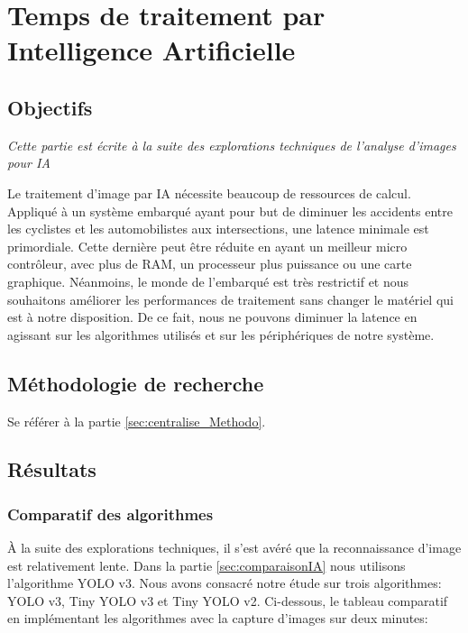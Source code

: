 \section{Temps de traitement par Intelligence Artificielle}
\label{sec:hwInference}

\subsection{Objectifs}
\label{sec:hwInference_Objectifs}

\textit{Cette partie est écrite à la suite des explorations techniques de l'analyse d'images pour \gls{IA}}

Le traitement d'image par \gls{IA} nécessite beaucoup de ressources de calcul. 
Appliqué à un système embarqué ayant pour but de diminuer les accidents entre les cyclistes et les automobilistes aux intersections, 
une latence minimale est primordiale.
Cette dernière peut être réduite en ayant un meilleur micro contrôleur, avec plus de RAM, un processeur plus puissance ou une carte graphique. 
Néanmoins, le monde de l'embarqué est très restrictif et nous souhaitons améliorer les performances de traitement sans changer le matériel qui est à notre disposition.
De ce fait, nous ne pouvons diminuer la latence en agissant sur les algorithmes utilisés et sur les périphériques de notre système.

\subsection{Méthodologie de recherche}
\label{sec:hwInference_Methodo}

Se référer à la partie \ref{sec:centralise_Methodo}.

\subsection{Résultats}
\label{sec:hwInference_resultats}

\subsubsection{Comparatif des algorithmes}
\label{sec:hwInference_comp_algo}

À la suite des explorations techniques, il s'est avéré que la reconnaissance d'image est relativement lente. Dans la partie \ref{sec:comparaisonIA} nous utilisons l'algorithme YOLO v3.
Nous avons consacré notre étude sur trois algorithmes: YOLO v3, Tiny YOLO v3 et Tiny YOLO v2. Ci-dessous, le tableau comparatif en implémentant les algorithmes avec la capture d'images sur deux minutes:


